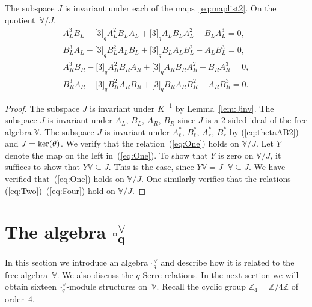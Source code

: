 \begin{Proposition}\label{prop:Jinv} The subspace $J$ is invariant under each of the maps~\eqref{eq:maplist2}. On the quotient~$\mathbb V/J$,
\begin{gather}\label{eq:One}
A_L^3 B_L-\lbrack 3 \rbrack_q A_L^2 B_L A_L+\lbrack 3 \rbrack_q A_L B_L A_L^2-B_L A_L^3 = 0,\\
\label{eq:Two}
B_L^3 A_L-\lbrack 3 \rbrack_q B_L^2 A_L B_L+\lbrack 3 \rbrack_q B_L A_L B_L^2-A_L B_L^3 = 0,\\
\label{eq:Three}
A_R^3 B_R-\lbrack 3 \rbrack_q A_R^2 B_R A_R+\lbrack 3 \rbrack_q A_R B_R A_R^2-B_R A_R^3 = 0,\\
\label{eq:Four}
B_R^3 A_R-\lbrack 3 \rbrack_q B_R^2 A_R B_R+\lbrack 3 \rbrack_q B_R A_R B_R^2-A_R B_R^3 = 0.
\end{gather}
\end{Proposition}
\begin{proof}The subspace $J$ is invariant under $K^{\pm 1}$ by Lemma~\ref{lem:Jinv}. The subspace $J$ is invariant under $A_L$, $B_L$, $A_R$, $B_R$ since $J$ is a 2-sided ideal of the free algebra $\mathbb V$. The subspace $J$ is invariant under $A^*_\ell$, $B^*_\ell$, $A^*_r$, $B^*_r$ by (\ref{eq:thetaAB2}) and $J={\rm ker}(\theta)$. We verify that the relation~(\ref{eq:One}) holds on $\mathbb V/J$. Let $Y$ denote the map on the left in~(\ref{eq:One}). To show that $Y$ is zero on $\mathbb V/J$, it suffices to show that $Y\mathbb V\subseteq J$. This is the case, since $Y\mathbb V = J^+\mathbb V\subseteq J$. We have verified that~(\ref{eq:One}) holds on $\mathbb V/J$. One similarly verifies that the relations (\ref{eq:Two})--(\ref{eq:Four}) hold on $\mathbb V/J$.
\end{proof}

\section[The algebra $\square^\vee_q$]{The algebra $\boldsymbol{\square^\vee_q}$}\label{section10}

In this section we introduce an algebra $\square^\vee_q$ and describe how it is related to the free algebra~$\mathbb V$. We also discuss the $q$-Serre relations. In the next section we will obtain sixteen $\square^\vee_q$-module structures on~$\mathbb V$. Recall the cyclic group $\mathbb Z_4 = \mathbb Z/4 \mathbb Z$ of order~4.

